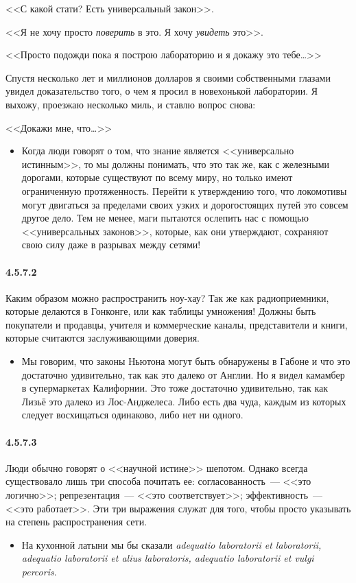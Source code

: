<<С какой стати? Есть универсальный закон>>.

<<Я не хочу просто {\itshape поверить} в это. Я хочу {\itshape увидеть} это>>.

<<Просто подожди пока я построю лабораторию и я докажу это тебе\ldots>>

Спустя несколько лет и миллионов долларов я своими собственными глазами увидел доказательство того, о чем я просил в новехонькой лаборатории. Я выхожу, проезжаю несколько миль, и ставлю вопрос снова:

<<Докажи мне, что\ldots>> 

	\begin{itemize}
	\item 
	Когда люди говорят о том, что знание является <<универсально истинным>>, то мы должны понимать, что это так же, как с железными дорогами, которые существуют по всему миру, но только имеют ограниченную протяженность. Перейти к утверждению того, что локомотивы могут двигаться за пределами своих узких и дорогостоящих путей это совсем другое дело. Тем не менее, маги пытаются ослепить нас с помощью <<универсальных законов>>, которые, как они утверждают, сохраняют свою силу даже в разрывах между сетями!
	\end{itemize}

\paragraph{4.5.7.2}\hypertarget{par:4.5.7.2}{} Каким образом можно распространить ноу-хау? Так же как радиоприемники, которые делаются в Гонконге, или как таблицы умножения! Должны быть покупатели и продавцы, учителя и коммерческие каналы, представители и книги, которые считаются заслуживающими доверия. 
	\begin{itemize}
	\item 
	Мы говорим, что законы Ньютона могут быть обнаружены в Габоне и что это достаточно удивительно, так как это далеко от Англии. Но я видел камамбер в супермаркетах Калифорнии. Это тоже достаточно удивительно, так как Лизьё это далеко из Лос-Анджелеса. Либо есть два чуда, каждым из которых следует восхищаться одинаково, либо нет ни одного.
	\end{itemize}	

\paragraph{4.5.7.3}\hypertarget{par:4.5.7.3}{} Люди обычно говорят о <<научной истине>> шепотом. Однако всегда существовало лишь три способа почитать ее: согласованность~--- <<это логично>>; репрезентация~--- <<это соответствует>>; эффективность~--- <<это работает>>. Эти три выражения служат для того, чтобы просто указывать на степень распространения сети. 
	\begin{itemize}
	\item 
	На кухонной латыни мы бы сказали {\itshape adequatio laboratorii et laboratorii, adequatio laboratorii et alius laboratoris, adequatio laboratorii et vulgi percoris}.
	\end{itemize}


